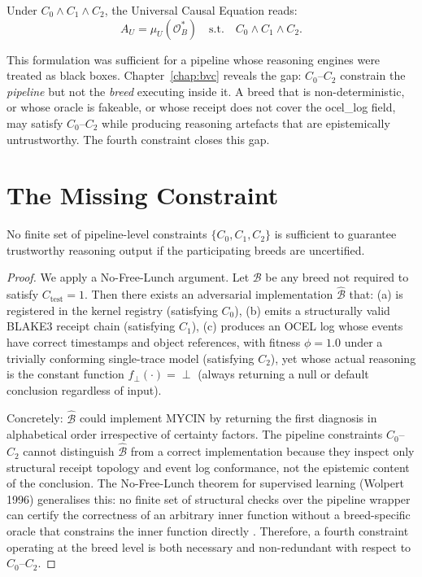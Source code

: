 Under $C_0 \wedge C_1 \wedge C_2$, the Universal Causal Equation reads:
\[
  A_U = \mu_U(\mathcal{O}^*_B)
  \quad \text{s.t.} \quad C_0 \wedge C_1 \wedge C_2.
\]

This formulation was sufficient for a pipeline whose reasoning engines were treated as
black boxes. Chapter~\ref{chap:bvc} reveals the gap: $C_0$--$C_2$ constrain the
\emph{pipeline} but not the \emph{breed} executing inside it. A breed that is
non-deterministic, or whose oracle is fakeable, or whose receipt does not cover the
ocel\_log field, may satisfy $C_0$--$C_2$ while producing reasoning artefacts that are
epistemically untrustworthy. The fourth constraint closes this gap.

\section{The Missing Constraint}
\label{sec:missing-constraint}

\begin{theorem}
\label{thm:fourth-constraint-necessity}
No finite set of pipeline-level constraints $\{C_0, C_1, C_2\}$ is sufficient to
guarantee trustworthy reasoning output if the participating breeds are uncertified.
\end{theorem}

\begin{proof}
We apply a No-Free-Lunch argument. Let $\mathcal{B}$ be any breed not required to
satisfy $C_{\mathrm{test}} = 1$. Then there exists an adversarial implementation
$\hat{\mathcal{B}}$ that:
(a) is registered in the kernel registry (satisfying $C_0$),
(b) emits a structurally valid BLAKE3 receipt chain (satisfying $C_1$),
(c) produces an OCEL log whose events have correct timestamps and object references,
    with fitness $\phi = 1.0$ under a trivially conforming single-trace model
    (satisfying $C_2$),
yet whose actual reasoning is the constant function $f_\perp(\cdot) = \perp$
(always returning a null or default conclusion regardless of input).

Concretely: $\hat{\mathcal{B}}$ could implement MYCIN by returning the first
diagnosis in alphabetical order irrespective of certainty factors. The pipeline
constraints $C_0$--$C_2$ cannot distinguish $\hat{\mathcal{B}}$ from a correct
implementation because they inspect only structural receipt topology and event log
conformance, not the epistemic content of the conclusion. The No-Free-Lunch theorem
for supervised learning (Wolpert 1996) generalises this: no finite set of structural
checks over the pipeline wrapper can certify the correctness of an arbitrary inner
function without a breed-specific oracle that constrains the inner function directly
\cite{wolpert1997nfl}.
Therefore, a fourth constraint operating at the breed level is both necessary and
non-redundant with respect to $C_0$--$C_2$.
\end{proof}

